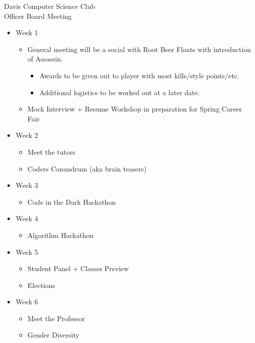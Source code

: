 \documentclass{article}
\begin{document}
\begin{Minutes}{Davis Computer Science Club\\Officer Board Meeting}
\begin{itemize}
    \item Week 1
        \begin{itemize}
            \item General meeting will be a social with Root Beer Floats with introduction of Assassin.
            \begin{itemize}
                \item Awards to be given out to player with most kills/style points/etc.
                \item Additional logistics to be worked out at a later date. 
            \end{itemize}
            \item Mock Interview + Resume Workshop in preparation for Spring Career Fair
        \end {itemize}
    
    \item Week 2
        \begin{itemize}
            \item Meet the tutors
            \item Coders Conundrum (aka brain teasers)
        \end{itemize}

    \item Week 3 
        \begin{itemize}
            \item Code in the Dark Hackathon
        \end{itemize}

    \item Week 4
        \begin{itemize}
            \item Algorithm Hackathon
        \end{itemize}

    \item Week 5
    \begin{itemize}
        \item Student Panel + Classes Preview
        \item Elections
    \end{itemize}

    \item Week 6
    \begin{itemize}
        \item Meet the Professor 
        \item Gender Diversity
    \end{itemize}


\end{itemize}
\end{Minutes}
\end{document}

